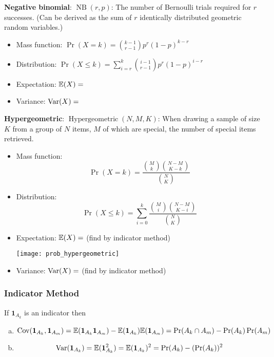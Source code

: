 \textbf{Negative binomial}: \( \operatorname{NB}(r, p)\): The number of Bernoulli trials required for \(r\) successes. (Can be derived as the sum of \(r\) identically distributed geometric random variables.)

\begin{itemize}

\item Mass function: \(\Pr(X = k) =  \binom{k-1}{r-1} p^r (1-p)^{k-r}\)

\item Distribution: \(\Pr(X \leq k) = \sum_{i=r}^k \binom{i-1}{r-1} p^r (1-p)^{i-r} \)

\item Expectation: \(\E(X) = \)

\item Variance: \(\Var(X) = \)

\end{itemize}


\textbf{Hypergeometric}: \( \operatorname{Hypergeometric}(N, M, K)\): When drawing a sample of size \(K\) from a group of \(N\) items, \(M\) of which are special, the number of special items retrieved.

\begin{itemize}

\item Mass function: \[\Pr(X = k) = \frac{\binom{M}{k} \binom{N-M}{K-k}}{\binom{N}{K}} \]

\item Distribution: \[\Pr(X \leq k) = \sum_{i=0}^k \frac{\binom{M}{i} \binom{N-M}{K-i}}{\binom{N}{K}}  \]

\item Expectation: \(\E(X) = \) (find by indicator method)

\texttt{[image: prob\_hypergeometric]}

\item Variance: \(\Var(X) = \) (find by indicator method)

\end{itemize}


\subsubsection{Indicator Method}

\begin{proposition} If \(\boldsymbol{1}_{A_k}\) is an indicator then

\begin{enumerate}[(a)]

\item

\[
\Cov(\boldsymbol{1}_{A_k}, \boldsymbol{1}_{A_m}) = \E(\boldsymbol{1}_{A_k} \boldsymbol{1}_{A_m}) - \E(\boldsymbol{1}_{A_k}) \E(\boldsymbol{1}_{A_m}) = \Pr(A_k \cap A_m) - \Pr(A_k) \Pr(A_m)
\]

\item

\[
\Var(\boldsymbol{1}_{A_k} ) = \E(\boldsymbol{1}_{A_k} ^2) = \E(\boldsymbol{1}_{A_k} )^2 = \Pr(A_k) - (\Pr(A_k))^2
\]

\end{enumerate}
\end{proposition}

